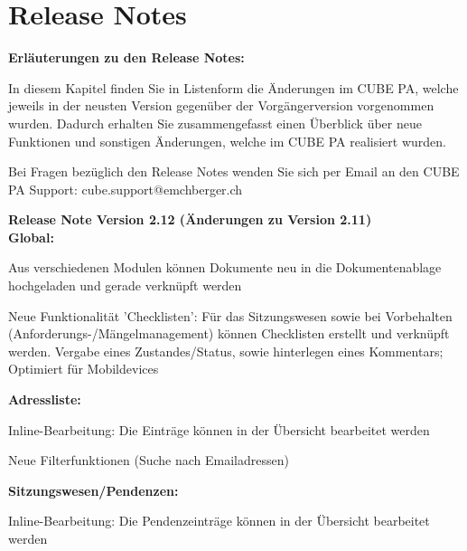 
\clearpage
\section{Release Notes}

\textbf{Erläuterungen zu den Release Notes:}

\vspace{\baselineskip}

In diesem Kapitel finden Sie in Listenform die Änderungen im CUBE PA, welche jeweils in der neusten Version gegenüber der Vorgängerversion vorgenommen wurden. Dadurch erhalten Sie zusammengefasst einen Überblick über neue Funktionen und sonstigen Änderungen, welche im CUBE PA realisiert wurden.

\vspace{\baselineskip}

Bei Fragen bezüglich den Release Notes wenden Sie sich per Email an den CUBE PA Support: {\color{red} cube.support@emchberger.ch}


\vspace{\baselineskip}

\textbf{Release Note Version 2.12 (Änderungen zu Version 2.11)} \\

\textbf{Global:}
\begin{compactitem}
	\item Aus verschiedenen Modulen können Dokumente neu in die Dokumentenablage hochgeladen und gerade verknüpft werden
	\item Neue Funktionalität 'Checklisten': Für das Sitzungswesen sowie bei Vorbehalten (Anforderungs-/Mängelmanagement) können Checklisten erstellt und verknüpft werden. Vergabe eines Zustandes/Status, sowie hinterlegen eines Kommentars; Optimiert für Mobildevices
\end{compactitem}

\textbf{Adressliste:}
\begin{compactitem}
	\item Inline-Bearbeitung: Die Einträge können in der Übersicht bearbeitet werden
	\item Neue Filterfunktionen (Suche nach Emailadressen)
\end{compactitem}

\textbf{Sitzungswesen/Pendenzen:}
\begin{compactitem}
	\item Inline-Bearbeitung: Die Pendenzeinträge können in der Übersicht bearbeitet werden
\end{compactitem}

